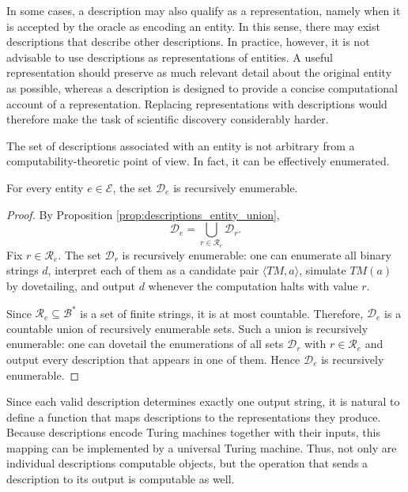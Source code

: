 In some cases, a description may also qualify as a representation, namely when it is accepted by the oracle as encoding an entity. In this sense, there may exist descriptions that describe other descriptions. In practice, however, it is not advisable to use descriptions as representations of entities. A useful representation should preserve as much relevant detail about the original entity as possible, whereas a description is designed to provide a concise computational account of a representation. Replacing representations with descriptions would therefore make the task of scientific discovery considerably harder.

The set of descriptions associated with an entity is not arbitrary from a computability-theoretic point of view. In fact, it can be effectively enumerated.

\begin{proposition}
\label{prop:De_recursively_enumerable}
For every entity $e \in \mathcal{E}$, the set $\mathcal{D}_e$ is recursively enumerable.
\end{proposition}

\begin{proof}
By Proposition \ref{prop:descriptions_entity_union},
\[
\mathcal{D}_e=\bigcup_{r\in \mathcal{R}_e}\mathcal{D}_r.
\]
Fix $r\in\mathcal{R}_e$. The set $\mathcal{D}_r$ is recursively enumerable: one can enumerate all binary strings $d$, interpret each of them as a candidate pair $\langle TM,a\rangle$, simulate $TM(a)$ by dovetailing, and output $d$ whenever the computation halts with value $r$.

Since $\mathcal{R}_e \subseteq \mathcal{B}^\ast$ is a set of finite strings, it is at most countable. Therefore, $\mathcal{D}_e$ is a countable union of recursively enumerable sets. Such a union is recursively enumerable: one can dovetail the enumerations of all sets $\mathcal{D}_r$ with $r\in\mathcal{R}_e$ and output every description that appears in one of them. Hence $\mathcal{D}_e$ is recursively enumerable.
\end{proof}

Since each valid description determines exactly one output string, it is natural to define a function that maps descriptions to the representations they produce. Because descriptions encode Turing machines together with their inputs, this mapping can be implemented by a universal Turing machine. Thus, not only are individual descriptions computable objects, but the operation that sends a description to its output is computable as well.

